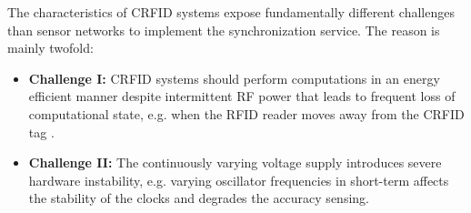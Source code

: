 \documentclass[journal,draftcls,onecolumn,12pt,twoside]{IEEEtranTCOM}
\begin{document}


\label{sec:Motivation}

The characteristics of CRFID systems expose fundamentally different challenges than sensor networks to implement the synchronization service. The reason is mainly twofold: 

\begin{itemize}
\item \textbf{Challenge I:} CRFID systems should perform computations in an energy efficient manner despite intermittent RF power that leads to frequent loss of computational state, e.g. when the RFID reader moves away from the CRFID tag \cite{ransford:2008}. 

\item \textbf{Challenge II:} The continuously varying voltage supply introduces severe hardware instability, e.g. varying oscillator frequencies in short-term affects the stability of the clocks and degrades the accuracy sensing.	
\end{itemize}
\end{document}
